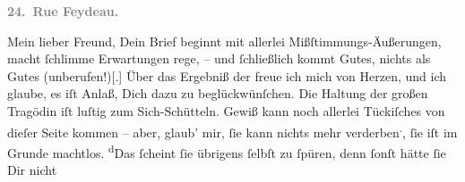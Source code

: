 \begin{ledgroupsized}[t]{13cm}
           \pstart
           \begin{otherlanguage}{french}\textcolor{gray}{\textbf{\textbf{24. Rue Feydeau.}}}\end{otherlanguage}\pend
           \pstart\center{}Mein lieber Freund,\pend\pstart
           Dein Brief beginnt mit allerlei Mißſtimmungs-Äußerungen, macht ſchlimme Erwartungen
               rege, – und ſchließlich kommt  Gutes, nichts als
               Gutes (unberufen!){[}.{]} Über das Ergebniß der \label{K_L02748-1v}\label{K_L02748-1h} freue ich mich von Herzen, und ich glaube, es iſt Anlaß, Dich dazu zu
               beglückwünſchen. Die Haltung der großen Tragödin iſt luſtig zum Sich-Schütteln. Gewiß kann noch
               allerlei Tückiſches von dieſer Seite kommen – {\pb}aber,
               glaub’ mir, ſie kann nichts
               mehr verderben\substVorne{}\textsuperscript{.}\substDazwischen{},\substHinten{} ſie iſt im Grunde machtlos. \substVorne{}\textsuperscript{d}\substDazwischen{}D\substHinten{}as ſcheint ſie übrigens ſelbſt zu ſpüren, denn ſonſt hätte ſie Dir nicht

\end{ledgroupsized}

